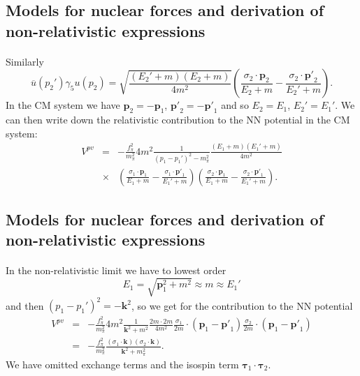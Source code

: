 \documentclass[%
twoside,                 %
final,                   %
10pt]{article}
\begin{document}
\subsection*{Models for nuclear forces and derivation of non-relativistic expressions}

\paragraph{}
Similarly
\[
\overline{u}(p_{2}')\gamma_{5}u(p_{2})=\sqrt{\frac{(E_{2}'+m)(E_{2}+m)}
{4m^{2}}}\left(\frac{\sigma_{2}\cdot \mathbf{p}_{2}}{E_{2}+m}-
\frac{\sigma_{2}\cdot\mathbf{p'}_{2}}{E_{2}'+m}\right).
\]
In the CM system we have $\mathbf{p}_{2}=-\mathbf{p}_{1}$, $\mathbf{p'}_{2}=
-\mathbf{p'}_{1}$ and so $E_{2}=E_{1}$, $E_{2}'=E_{1}'$.  
We can then write down the relativistic contribution 
to the NN potential in the CM system: 
\begin{eqnarray}
V^{pv}&=&-\frac{f_{\pi}^{2}}{m_{\pi}^{2}}4m^{2}\frac{1}{(p_{1}-p_{1}')^{2}-
m_{\pi}^{2}}\frac{(E_{1}+m)(E_{1}'+m)}{4m^{2}} \nonumber \\ 
 &\times&\left(\frac{\sigma_{1}\cdot\mathbf{p}_{1}}{E_{1}+m}-\frac{\sigma_{1}
\cdot\mathbf{p'}_{1}}{E_{1}'+m}\right)\left(\frac{\sigma_{2}\cdot\mathbf{p}_{1}}
{E_{1}+m}-\frac{\sigma_{2}\cdot\mathbf{p'}_{1}}{E_{1}'+m}\right). \nonumber
\end{eqnarray}



\subsection*{Models for nuclear forces and derivation of non-relativistic expressions}

\paragraph{}
In the non-relativistic limit we have to lowest order 
\[
E_{1}=\sqrt{\mathbf{p}_{1}^{2}+m^{2}}\approx m \approx E_{1}'
\]
and then $(p_{1}-p_{1}')^{2}=-\mathbf{k}^{2}$, so we get 
for the contribution to the NN potential
\begin{eqnarray}
V^{pv}&=&-\frac{f_{\pi}^{2}}{m_{\pi}^{2}}4m^{2}\frac{1}{\mathbf{k}^{2}+m^{2}}
\frac{2m\cdot 2m}{4m^{2}}\frac{\sigma_{1}}{2m}\cdot(\mathbf{p}_{1}-\mathbf{p'}_{1})
\frac{\sigma_{2}}{2m}\cdot (\mathbf{p}_{1}-\mathbf{p'}_{1}) \nonumber \\ 
 &=&-\frac{f_{\pi}^{2}}{m_{\pi}^{2}}
\frac{(\sigma_{1}\cdot\mathbf{k})(\sigma_{2}\cdot\mathbf{k})}{\mathbf{k}^{2}+m_{\pi}^{2}}.
\nonumber
\end{eqnarray}
We have omitted exchange terms and the isospin term $\mathbf{\tau}_1\cdot\mathbf{\tau}_2$.
\end{document}

